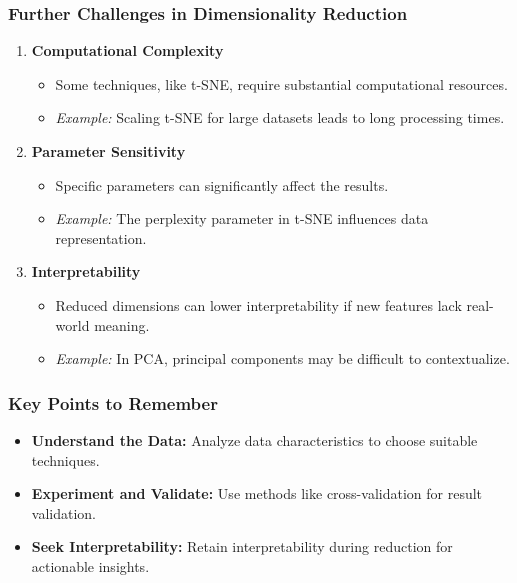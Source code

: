 \documentclass[aspectratio=169]{beamer}
\begin{document}
\begin{frame}[fragile]
    \frametitle{Further Challenges in Dimensionality Reduction}
    \begin{enumerate}[start=4]
        \item \textbf{Computational Complexity}
            \begin{itemize}
                \item Some techniques, like t-SNE, require substantial computational resources.
                \item \textit{Example:} Scaling t-SNE for large datasets leads to long processing times.
            \end{itemize}
        \item \textbf{Parameter Sensitivity}
            \begin{itemize}
                \item Specific parameters can significantly affect the results.
                \item \textit{Example:} The perplexity parameter in t-SNE influences data representation.
            \end{itemize}
        \item \textbf{Interpretability}
            \begin{itemize}
                \item Reduced dimensions can lower interpretability if new features lack real-world meaning.
                \item \textit{Example:} In PCA, principal components may be difficult to contextualize.
            \end{itemize}
    \end{enumerate}
\end{frame}

\begin{frame}[fragile]
    \frametitle{Key Points to Remember}
    \begin{itemize}
        \item \textbf{Understand the Data:} Analyze data characteristics to choose suitable techniques.
        \item \textbf{Experiment and Validate:} Use methods like cross-validation for result validation.
        \item \textbf{Seek Interpretability:} Retain interpretability during reduction for actionable insights.
    \end{itemize}
\end{frame}
\end{document}
